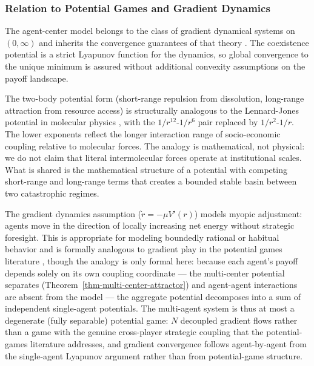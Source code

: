 \documentclass[11pt]{article}
\theoremstyle{plain}
\theoremstyle{definition}
\theoremstyle{remark}
\let\origsubsubsection\subsubsection
\renewcommand{\subsubsection}{\needspace{4\baselineskip}\origsubsubsection}
\begin{document}
\subsubsection{Relation to Potential Games and Gradient
Dynamics}\label{relation-to-potential-games-and-gradient-dynamics}

The agent-center model belongs to the class of gradient dynamical
systems on \((0, \infty)\) and inherits the convergence guarantees of
that theory \citep{Strogatz2015, HirschSmaleDevaney2012}. The
coexistence potential is a strict Lyapunov function for the dynamics, so
global convergence to the unique minimum is assured without additional
convexity assumptions on the payoff landscape.

The two-body potential form (short-range repulsion from dissolution,
long-range attraction from resource access) is structurally analogous to
the Lennard-Jones potential in molecular physics \citep{Jones1924}, with
the \(1/r^{12}\)-\(1/r^6\) pair replaced by \(1/r^2\)-\(1/r\). The lower
exponents reflect the longer interaction range of socio-economic
coupling relative to molecular forces. The analogy is mathematical, not
physical: we do not claim that literal intermolecular forces operate at
institutional scales. What is shared is the mathematical structure of a
potential with competing short-range and long-range terms that creates a
bounded stable basin between two catastrophic regimes.

The gradient dynamics assumption (\(\dot{r} = -\mu V'(r)\)) models
myopic adjustment: agents move in the direction of locally increasing
net energy without strategic foresight. This is appropriate for modeling
boundedly rational or habitual behavior and is formally analogous to
gradient play in the potential games literature
\citep{MondererShapley1996, Sandholm2010}, though the analogy is only
formal here: because each agent's payoff depends solely on its own
coupling coordinate --- the multi-center potential separates
(Theorem~\ref{thm-multi-center-attractor}) and agent-agent interactions
are absent from the model --- the aggregate potential decomposes into a
sum of independent single-agent potentials. The multi-agent system is
thus at most a degenerate (fully separable) potential game: \(N\)
decoupled gradient flows rather than a game with the genuine
cross-player strategic coupling that the potential-games literature
addresses, and gradient convergence follows agent-by-agent from the
single-agent Lyapunov argument rather than from potential-game
structure.
\end{document}
